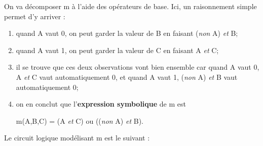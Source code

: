 On va décomposer m à l'aide des opérateurs de base. Ici, un raisonnement simple permet d'y arriver :
\begin{enumerate}[--]
    \item quand A vaut 0, on peut garder la valeur de B en faisant (\textit{non} A) \textit{et} B;
    \item quand A vaut 1, on peut garder la valeur de C en faisant A \textit{et} C;
    \item il se trouve que ces deux observations vont bien ensemble car quand A vaut 0, A \textit{et} C vaut automatiquement 0, et quand A vaut
          1, (\textit{non} A) \textit{et} B vaut automatiquement 0;
    \item on en conclut que l'\textbf{expression symbolique} de m est
          \begin{center}
              m(A,B,C) =  (A \textit{et} C) ou ((\textit{non} A)  \textit{et} B).
          \end{center}
\end{enumerate}
Le circuit logique modélisant m est le suivant :
\begin{center}
\end{center}


